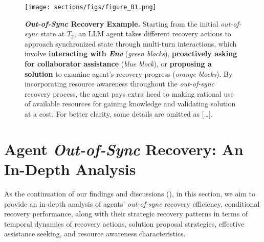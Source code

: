\begin{figure}[!t]
\begin{center}
\begin{small}
\vspace{0em}
    \texttt{[image: sections/figs/figure\_B1.png]}
    \caption{\textbf{\textit{Out-of-Sync} Recovery Example.} Starting from the initial \textit{out-of-sync} state at $T_2$, an LLM agent takes different recovery actions to approach synchronized state through multi-turn interactions, which involve \textcolor{fig2_env}{\textbf{interacting with \textit{Env}}} (\textit{green blocks}), \textcolor{fig2_ask}{\textbf{proactively asking for collaborator assistance}} (\textit{blue block}), or \textcolor{fig2_code}{\textbf{proposing a solution}} to examine agent's recovery progress (\textit{orange blocks}). By incorporating resource awareness throughout the \textit{out-of-sync} recovery process, the agent pays extra heed to making rational use of available resources for gaining knowledge and validating solution at a cost. For better clarity, some details are omitted as […].}
    \vspace{0em}  %
    \label{fig:figure B1 (benchmark example)}
\end{small}
\end{center}
\end{figure}








\section{Agent \textit{Out-of-Sync} Recovery: An In-Depth Analysis}
\label{Appendix: C (Analysis Extension)}

\renewcommand{\thefigure}{C\arabic{figure}} %
\renewcommand{\thetable}{C\arabic{table}}   %
\setcounter{figure}{0} %
\setcounter{table}{0}  %



As the continuation of our findings and discussions (), in this section, we aim to provide an in-depth analysis of agents' \textit{out-of-sync} recovery efficiency, conditional recovery performance, along with their strategic recovery patterns in terms of temporal dynamics of recovery actions, solution proposal strategies, effective assistance seeking, and resource awareness characteristics.







